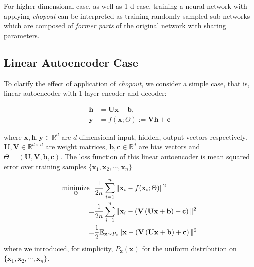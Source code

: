\documentclass{article}
\newcommand{\minimize}{\mathop{\rm minimize}\limits}
\begin{document}
    For higher dimensional case, as well as 1-d case, training a neural network with applying \textit{chopout} can be interpreted as training randomly sampled sub-networks which are composed of \textit{former parts} of the original network with sharing parameters.

    \subsection{Linear Autoencoder Case}
    \label{subsec:linae}
    
    To clarify the effect of application of \textit{chopout}, we consider a simple case, that is, linear autoencoder with 1-layer encoder and decoder:
    
    \begin{align}
        \mathbf{h} &= \mathbf{U} \mathbf{x} + \mathbf{b}, \nonumber \\
        \mathbf{y} &= f(\mathbf{x}; \Theta) := \mathbf{V} \mathbf{h} + \mathbf{c} \nonumber
    \end{align}
    
    where $\mathbf{x},\mathbf{h}, \mathbf{y} \in \mathbb{R}^d$ are $d$-dimensional input, hidden, output vectors respectively. $\mathbf{U}, \mathbf{V} \in \mathbb{R}^{d \times d}$ are weight matrices, $\mathbf{b}, \mathbf{c} \in \mathbb{R}^d$ are bias vectors and $\Theta = (\mathbf{U}, \mathbf{V}, \mathbf{b}, \mathbf{c})$. The loss function of this linear autoencoder is mean squared error over training samples $\{\mathbf{x}_1, \mathbf{x}_2, \cdots, \mathbf{x}_n\}$
    
    \begin{align}
        \minimize_{\Theta} \ \  
        &\frac{1}{2n} \sum_{i=1}^n \Vert \mathbf{x}_i - f(\mathbf{x}_i; \Theta) \Vert^2 \nonumber \\
        =& \frac{1}{2n} \sum_{i=1}^n \Vert \mathbf{x}_i - \left( \mathbf{V} \left( \mathbf{U} \mathbf{x} + \mathbf{b} \right) + \mathbf{c} \right) \Vert^2 \nonumber \\
        =& \frac{1}{2} \mathbb{E}_{\mathbf{x} \sim P_x} \Vert \mathbf{x} - \left( \mathbf{V} \left( \mathbf{U} \mathbf{x} + \mathbf{b} \right) + \mathbf{c} \right) \Vert^2 
    \end{align}
    where we introduced, for simplicity, $P_\mathbf{x}(\mathbf{x})$ for the uniform distribution on $\{\mathbf{x}_1, \mathbf{x}_2, \cdots, \mathbf{x}_n\}$.
    
\end{document}
